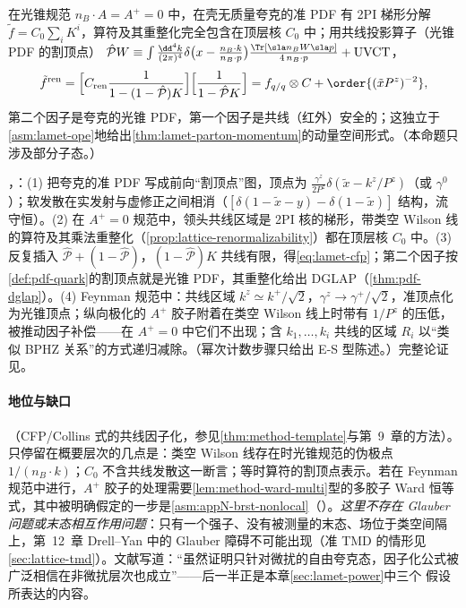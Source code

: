\begin{proposition}\label{prop:lamet-cfp}
在光锥规范 $n_B\cdot A=A^+=0$ 中，在壳无质量夸克的准 PDF 有 2PI 梯形分解 $\tilde f=C_0\sum_iK^i$，算符及其重整化完全包含在顶层核 $C_0$ 中；用共线投影算子（光锥 PDF 的割顶点）
$\hat{\mathcal P}W\equiv\int\frac{\dd^4k}{(2\pi)^4}\delta\big(x-\frac{n_B\cdot k}{n_B\cdot p}\big)\frac{\Tr[\sla n_BW\sla p]}{4\,n_B\cdot p}+\text{UVCT}$，
\begin{equation}\label{eq:lamet-cfp}
\tilde f^{\rm ren}=\Big[C_{\rm ren}\frac1{1-(1-\hat{\mathcal P})K}\Big]\Big[\frac1{1-\hat{\mathcal P}K}\Big]=f_{q/q}\otimes C+\order{(\tilde xP^z)^{-2}},
\end{equation}
第二个因子是夸克的光锥 PDF，第一个因子是共线（红外）安全的；这独立于\cref{asm:lamet-ope}地给出\cref{thm:lamet-parton-momentum}的动量空间形式。（本命题只涉及部分子态。）
\end{proposition}

\begin{proofsketch}
\cite{Ma:2014jla}，\cite[第~III.B~节]{JiEtAl2021}：(1) 把夸克的准 PDF 写成前向“割顶点”图，顶点为 $\frac{\gamma^z}{2P^z}\delta(\tilde x-k^z/P^z)$（或 $\gamma^0$）；软发散在实发射与虚修正之间相消（$[\delta(1-\tilde x-y)-\delta(1-\tilde x)]$ 结构，流守恒）。(2) 在 $A^+=0$ 规范中，领头共线区域是 2PI 核的梯形\cite{EllisEtAl1979,CurciFurmanskiPetronzio1980}，带类空 Wilson 线的算符及其乘法重整化（\cref{prop:lattice-renormalizability}）都在顶层核 $C_0$ 中。(3) 反复插入 $\hat{\mathcal P}+(1-\hat{\mathcal P})$，$(1-\hat{\mathcal P})K$ 共线有限，得\cref{eq:lamet-cfp}；第二个因子按\cref{def:pdf-quark}的割顶点就是光锥 PDF，其重整化给出 DGLAP（\cref{thm:pdf-dglap}）。(4) Feynman 规范中：共线区域 $k^z\simeq k^+/\sqrt2$，$\gamma^z\to\gamma^+/\sqrt2$，准顶点化为光锥顶点；纵向极化的 $A^+$ 胶子附着在类空 Wilson 线上时带有 $1/P^z$ 的压低，被推动因子补偿——在 $A^+=0$ 中它们不出现；含 $k_1,\dots,k_i$ 共线的区域 $R_i$ 以“类似 BPHZ 关系”的方式递归减除\cite[第~III.B~节]{JiEtAl2021}。（幂次计数步骤只给出 E-S 型陈述。）完整论证见\cite{Ma:2014jla}。
\end{proofsketch}

\paragraph{地位与缺口}
\tagA（CFP/Collins 式的共线因子化，参见\cref{thm:method-template}与第~9~章的方法）。只停留在概要层次的几点是：类空 Wilson 线存在时光锥规范的伪极点 $1/(n_B\cdot k)$；$C_0$ 不含共线发散这一断言；等时算符的割顶点表示。若在 Feynman 规范中进行，$A^+$ 胶子的处理需要\cref{lem:method-ward-multi}型的多胶子 Ward 恒等式，其中被明确假定的一步是\cref{asm:appN-brst-nonlocal}（\tagC）。\emph{这里不存在 Glauber 问题或末态相互作用问题}：只有一个强子、没有被测量的末态、场位于类空间隔上，第~12~章 Drell--Yan 中的 Glauber 障碍不可能出现（准 TMD 的情形见\cref{sec:lattice-tmd}）。文献\cite{JiEtAl2021}写道：“虽然证明只针对微扰的自由夸克态，因子化公式被广泛相信在非微扰层次也成立”——后一半正是本章\cref{sec:lamet-power}中三个 \tagC 假设所表达的内容。

